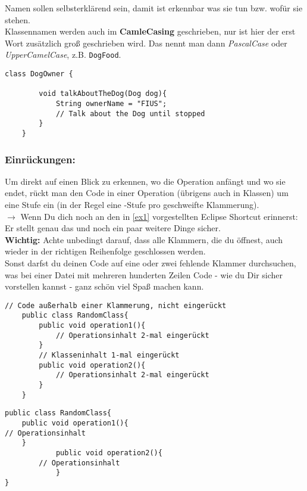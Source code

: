 \noindent
Namen sollen selbsterklärend sein, damit ist erkennbar was sie tun bzw. wofür sie stehen.\\

\noindent
Klassennamen werden auch im \textbf{CamleCasing} geschrieben, nur ist hier der erst Wort zusätzlich groß geschrieben wird.
Das nennt man dann \textit{PascalCase} oder \textit{UpperCamelCase}, z.B. \lstinline{DogFood}.

\vspace{5mm}

\newpage

\begin{lstlisting}[title=\textbf{Beispiel gute Namensgebung}]
	class DogOwner {

		void talkAboutTheDog(Dog dog){
			String ownerName = "FIUS";
			// Talk about the Dog until stopped
		}
	}
\end{lstlisting}

\subsubsection*{Einrückungen:}
Um direkt auf einen Blick zu erkennen, wo die Operation anfängt und wo sie endet, rückt man den Code in einer Operation (übrigens auch in Klassen) um eine Stufe ein (in der Regel eine -Stufe pro geschweifte Klammerung).\\
$\rightarrow$ Wenn Du dich noch an den in \ref{ex1} vorgestellten Eclipse Shortcut erinnerst: Er stellt genau das und noch ein paar weitere Dinge sicher.\\

\noindent
{\color{red}\bfseries Wichtig:} Achte unbedingt darauf, dass alle Klammern, die du öffnest, auch wieder in der richtigen Reihenfolge geschlossen werden.\\
Sonst darfst du deinen Code auf eine oder zwei fehlende Klammer durchsuchen, was bei einer Datei mit mehreren hunderten Zeilen Code - wie du Dir sicher vorstellen kannst - ganz schön viel Spaß machen kann.

\begin{lstlisting}[title=\textbf{Beispiel gute Namensgebung}]
	// Code außerhalb einer Klammerung, nicht eingerückt
	public class RandomClass{
		public void operation1(){
			// Operationsinhalt 2-mal eingerückt
		}
		// Klasseninhalt 1-mal eingerückt
		public void operation2(){
			// Operationsinhalt 2-mal eingerückt
		}
	}
\end{lstlisting}

\begin{lstlisting}[title=\textbf{Beispiel schlechte Einrückung}]
	public class RandomClass{
	public void operation1(){
// Operationsinhalt
	}
			public void operation2(){
		// Operationsinhalt
			}
}
\end{lstlisting}
